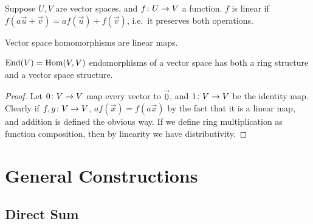 \begin{definition}
    Suppose \(U,V\) are vector spaces, and \(f\colon U\to V\) a function.
    \(f\) is linear if \(f(a\vec{u}+\vec{v}) = af(\vec{u}) + f(\vec{v})\),
    i.e.\ it preserves both operations.
\end{definition}
\begin{definition}
    Vector space homomorphisms are linear maps.
\end{definition}
\begin{proposition}
    \(\operatorname{End}(V) = \operatorname{Hom}(V,V)\) endomorphisms of a vector space
    has both a ring structure and a vector space structure.
\end{proposition}
\begin{proof}
    Let \(0\colon V\to V\) map every vector to \(\vec{0}\),
    and \(1\colon V\to V\) be the identity map.
    Clearly if \(f,g\colon V\to V\),
    \(af(\vec{x}) = f(a\vec{x})\) by the fact that it is a linear map,
    and addition is defined the obvious way.
    If we define ring multiplication as function composition,
    then by linearity we have distributivity.
\end{proof}


\section{General Constructions}

\subsection*{Direct Sum}


